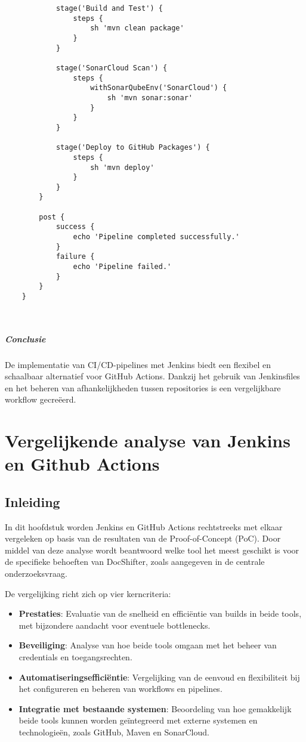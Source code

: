 \begin{verbatim}
            stage('Build and Test') {
                steps {
                    sh 'mvn clean package'
                }
            }
            
            stage('SonarCloud Scan') {
                steps {
                    withSonarQubeEnv('SonarCloud') {
                        sh 'mvn sonar:sonar'
                    }
                }
            }
            
            stage('Deploy to GitHub Packages') {
                steps {
                    sh 'mvn deploy'
                }
            }
        }
        
        post {
            success {
                echo 'Pipeline completed successfully.'
            }
            failure {
                echo 'Pipeline failed.'
            }
        }
    }

   
\end{verbatim}

\subparagraph{Conclusie}
De implementatie van CI/CD-pipelines met Jenkins biedt een flexibel en schaalbaar alternatief voor GitHub Actions. Dankzij het gebruik van Jenkinsfiles en het beheren van afhankelijkheden tussen repositories is een vergelijkbare workflow gecreëerd.


\section{Vergelijkende analyse van Jenkins en Github Actions}

\subsection{Inleiding}
In dit hoofdstuk worden Jenkins en GitHub Actions rechtstreeks met elkaar vergeleken op basis van de resultaten van de Proof-of-Concept (PoC). Door middel van deze analyse wordt beantwoord welke tool het meest geschikt is voor de specifieke behoeften van DocShifter, zoals aangegeven in de centrale onderzoeksvraag.

De vergelijking richt zich op vier kerncriteria:
\begin{itemize}
    \item \textbf{Prestaties}: Evaluatie van de snelheid en efficiëntie van builds in beide tools, met bijzondere aandacht voor eventuele bottlenecks.
    \item \textbf{Beveiliging}: Analyse van hoe beide tools omgaan met het beheer van credentials en toegangsrechten.
    \item \textbf{Automatiseringsefficiëntie}: Vergelijking van de eenvoud en flexibiliteit bij het configureren en beheren van workflows en pipelines.
    \item \textbf{Integratie met bestaande systemen}: Beoordeling van hoe gemakkelijk beide tools kunnen worden geïntegreerd met externe systemen en technologieën, zoals GitHub, Maven en SonarCloud.
\end{itemize}

